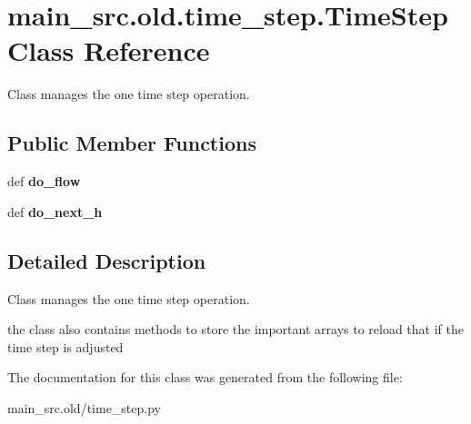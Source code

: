 \hypertarget{classmain__src_8old_1_1time__step_1_1TimeStep}{\section{main\-\_\-src.\-old.\-time\-\_\-step.\-Time\-Step Class Reference}
\label{classmain__src_8old_1_1time__step_1_1TimeStep}
}


Class manages the one time step operation.  


\subsection*{Public Member Functions}
\begin{DoxyCompactItemize}
\item 
\hypertarget{classmain__src_8old_1_1time__step_1_1TimeStep_a0c3f8e6422ef193060abe802ac0d30e1}{def {\bfseries do\-\_\-flow}}\label{classmain__src_8old_1_1time__step_1_1TimeStep_a0c3f8e6422ef193060abe802ac0d30e1}

\item 
\hypertarget{classmain__src_8old_1_1time__step_1_1TimeStep_a5e7e3c5a1a81e7d9a38322871cdde722}{def {\bfseries do\-\_\-next\-\_\-h}}\label{classmain__src_8old_1_1time__step_1_1TimeStep_a5e7e3c5a1a81e7d9a38322871cdde722}

\end{DoxyCompactItemize}


\subsection{Detailed Description}
Class manages the one time step operation. 

the class also contains methods to store the important arrays to reload that if the time step is adjusted 

The documentation for this class was generated from the following file\-:\begin{DoxyCompactItemize}
\item 
main\-\_\-src.\-old/time\-\_\-step.\-py\end{DoxyCompactItemize}

